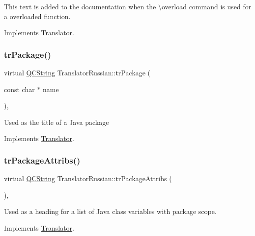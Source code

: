 This text is added to the documentation when the \textbackslash{}overload command is used for a overloaded function. 

Implements \mbox{\hyperlink{class_translator}{Translator}}.

\mbox{\label{class_translator_russian_a6add83094f61e49f3fa80d7af3be2815}} 
\subsubsection{\texorpdfstring{trPackage()}{trPackage()}}
{\footnotesize\ttfamily virtual \mbox{\hyperlink{class_q_c_string}{Q\+C\+String}} Translator\+Russian\+::tr\+Package (\begin{DoxyParamCaption}\item[{const char $\ast$}]{name }\end{DoxyParamCaption})\hspace{0.3cm}{\ttfamily [inline]}, {\ttfamily [virtual]}}

Used as the title of a Java package 

Implements \mbox{\hyperlink{class_translator}{Translator}}.

\mbox{\label{class_translator_russian_af7566799918849271ad1108f25ab9539}} 
\subsubsection{\texorpdfstring{trPackageAttribs()}{trPackageAttribs()}}
{\footnotesize\ttfamily virtual \mbox{\hyperlink{class_q_c_string}{Q\+C\+String}} Translator\+Russian\+::tr\+Package\+Attribs (\begin{DoxyParamCaption}{ }\end{DoxyParamCaption})\hspace{0.3cm}{\ttfamily [inline]}, {\ttfamily [virtual]}}

Used as a heading for a list of Java class variables with package scope. 

Implements \mbox{\hyperlink{class_translator}{Translator}}.

\mbox{\label{class_translator_russian_a3e21ebd9a6d65be2566e9106f826566c}} 
